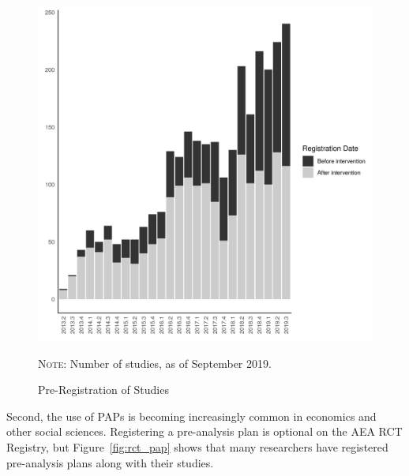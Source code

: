 \documentclass[PP]{AEA}
\begin{document}
\begin{figure}[h]
	\includegraphics[height=0.4\textheight]{images/figure_preregistrations.png}
	\caption{Pre-Registration of Studies\label{fig:rct_pre}}
	
	\centering \footnotesize \textsc{Note:} Number of studies, as of September 2019.
\end{figure} 

Second, the use of \acp{PAP} is becoming increasingly common in economics and other social sciences. Registering a pre-analysis plan is optional on the AEA RCT Registry, but  Figure~\ref{fig:rct_pap} shows that many researchers have registered pre-analysis plans along with their studies.
\end{document}
